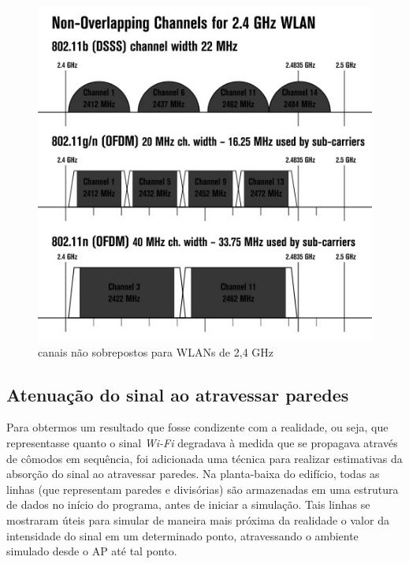 \documentclass[
	12pt,				%
	openright,			%
	twoside,			%
	a4paper,			%
	english,			%
	french,				%
	spanish,			%
	brazil				%
	]{abntex2}
\begin{document}
\begin{figure}[htb]
	\caption{\label{canais} canais não sobrepostos para WLANs de 2,4 GHz}
	\begin{center}
		\includegraphics[scale=0.6]{images/canais-1.jpg}
	\end{center}
\end{figure}

\subsection[Atenuação do sinal ao atravessar paredes]{Atenuação do sinal ao atravessar paredes}

Para obtermos um resultado que fosse condizente com a realidade, ou seja, que representasse quanto o sinal \textit{Wi-Fi} degradava à medida que se propagava através de cômodos em sequência, foi adicionada uma técnica para realizar estimativas da absorção do sinal ao atravessar paredes. Na planta-baixa do edifício, todas as linhas (que representam paredes e divisórias) são armazenadas em uma estrutura de dados no início do programa, antes de iniciar a simulação. Tais linhas se mostraram úteis para simular de maneira mais próxima da realidade o valor da intensidade do sinal em um determinado ponto, atravessando o ambiente simulado desde o AP até tal ponto.
\end{document}
